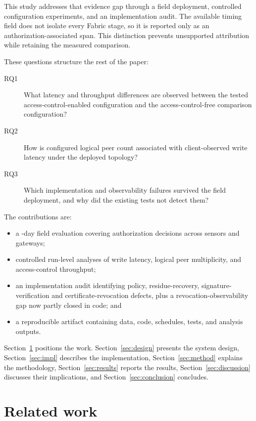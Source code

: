 \documentclass[a4paper,fleqn]{cas-sc}
\begin{document}
This study addresses that evidence gap through a field deployment, controlled
configuration experiments, and an implementation audit. The available timing
field does not isolate every Fabric stage, so it is reported only as an
authorization-associated span. This distinction prevents unsupported
attribution while retaining the measured comparison.

These questions structure the rest of the paper:

\begin{description}
\item[RQ1] What latency and throughput differences are observed between the
  tested access-control-enabled configuration and the access-control-free
  comparison configuration?
\item[RQ2] How is configured logical peer count associated with
  client-observed write latency under the deployed topology?
\item[RQ3] Which implementation and observability failures survived the
  field deployment, and why did the existing tests not detect them?
\end{description}

The contributions are:
\begin{itemize}
\item a \DeployDays{}-day field evaluation covering \TotalDecisions{}
authorization decisions across \DeploySensors{} sensors and
\DeployGateways{} gateways;
\item controlled run-level analyses of write latency, logical peer
multiplicity, and access-control throughput;
\item an implementation audit identifying policy, residue-recovery,
signature-verification and certificate-revocation defects, plus a
revocation-observability gap now partly closed in code; and
\item a reproducible artifact containing data, code, schedules, tests, and
analysis outputs.
\end{itemize}

Section~\ref{sec:related} positions the work. Section~\ref{sec:design}
presents the system design, Section~\ref{sec:impl} describes the
implementation, Section~\ref{sec:method} explains the methodology,
Section~\ref{sec:results} reports the results, Section~\ref{sec:discussion}
discusses their implications, and Section~\ref{sec:conclusion} concludes.

\section{Related work}
\label{sec:related}
\end{document}

